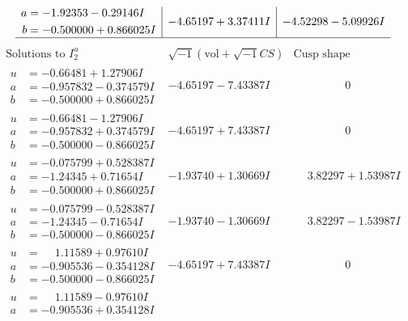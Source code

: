 \documentclass[1p]{elsarticle_modified}
\theoremstyle{definition}
\newcommand{\I}{\sqrt{-1}}
\begin{document}
$$\begin{array}{c|c|c}
\begin{aligned}
a &= -1.92353 - 0.29146 I \\
b &= -0.500000 + 0.866025 I\end{aligned}
 & -4.65197 + 3.37411 I & -4.52298 - 5.09926 I\\
 \hline 
 \end{array}$$\newpage$$\begin{array}{c|c|c}  
\text{Solutions to }I^u_{2}& \I (\text{vol} + \sqrt{-1}CS) & \text{Cusp shape}\\
 \hline 
\begin{aligned}
u &= -0.66481 + 1.27906 I \\
a &= -0.957832 - 0.374579 I \\
b &= -0.500000 + 0.866025 I\end{aligned}
 & -4.65197 - 7.43387 I & \phantom{-0.000000 } 0 \\ \hline\begin{aligned}
u &= -0.66481 - 1.27906 I \\
a &= -0.957832 + 0.374579 I \\
b &= -0.500000 - 0.866025 I\end{aligned}
 & -4.65197 + 7.43387 I & \phantom{-0.000000 } 0 \\ \hline\begin{aligned}
u &= -0.075799 + 0.528387 I \\
a &= -1.24345 + 0.71654 I \\
b &= -0.500000 + 0.866025 I\end{aligned}
 & -1.93740 + 1.30669 I & \phantom{-}3.82297 + 1.53987 I \\ \hline\begin{aligned}
u &= -0.075799 - 0.528387 I \\
a &= -1.24345 - 0.71654 I \\
b &= -0.500000 - 0.866025 I\end{aligned}
 & -1.93740 - 1.30669 I & \phantom{-}3.82297 - 1.53987 I \\ \hline\begin{aligned}
u &= \phantom{-}1.11589 + 0.97610 I \\
a &= -0.905536 - 0.354128 I \\
b &= -0.500000 - 0.866025 I\end{aligned}
 & -4.65197 + 7.43387 I & \phantom{-0.000000 } 0 \\ \hline\begin{aligned}
u &= \phantom{-}1.11589 - 0.97610 I \\
a &= -0.905536 + 0.354128 I \\

\end{aligned}
\end{array}$$
\end{document}
